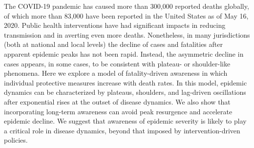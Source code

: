 The COVID-19 pandemic has caused more than 300,000 reported deaths
globally, of which more than 83,000 have been reported
in the United States as of May 16, 2020. Public health interventions
have had significant impacts in reducing transmission and in
averting even more deaths. Nonetheless, in many jurisdictions
(both at national and local levels) the decline of cases and fatalities
after apparent epidemic peaks has not been rapid.  Instead, the asymmetric
decline in cases appears, in some cases, to be consistent
with plateau- or shoulder-like phenomena.  
Here we explore a model of fatality-driven
awareness in which individual protective measures increase
with death rates.  In this model, epidemic dynamics
can be characterized by plateaus, shoulders,
and lag-driven oscillations after exponential rises
at the outset of disease dynamics. We also show that
incorporating long-term awareness can avoid peak resurgence and accelerate
epidemic decline.  We suggest that awareness of epidemic severity 
is likely to play a critical
role in disease dynamics, beyond that imposed by intervention-driven policies.
